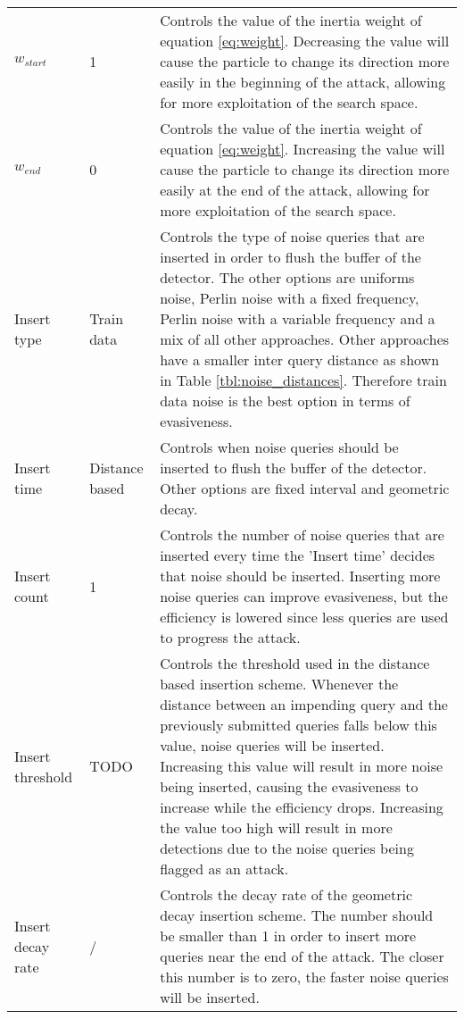 \begin{longtable}{p{3cm}p{2.5cm}p{7cm}}
$w_{start}$ &1 &Controls the value of the inertia weight of equation \ref{eq:weight}. Decreasing the value will cause the particle to change its direction more easily in the beginning of the attack, allowing for more exploitation of the search space.\\
$w_{end}$ &0 &Controls the value of the inertia weight of equation \ref{eq:weight}. Increasing the value will cause the particle to change its direction more easily at the end of the attack, allowing for more exploitation of the search space.\\
Insert type &Train data &Controls the type of noise queries that are inserted in order to flush the buffer of the detector. The other options are uniforms noise, Perlin noise with a fixed frequency, Perlin noise with a variable frequency and a mix of all other approaches. Other approaches have a smaller inter query distance as shown in Table \ref{tbl:noise_distances}. Therefore train data noise is the best option in terms of evasiveness.\\
Insert time &Distance based &Controls when noise queries should be inserted to flush the buffer of the detector. Other options are fixed interval and geometric decay.\\
Insert count &1 &Controls the number of noise queries that are inserted every time the 'Insert time' decides that noise should be inserted. Inserting more noise queries can improve evasiveness, but the efficiency is lowered since less queries are used to progress the attack.\\
Insert threshold &TODO &Controls the threshold used in the distance based insertion scheme. Whenever the distance between an impending query and the previously submitted queries falls below this value, noise queries will be inserted. Increasing this value will result in more noise being inserted, causing the evasiveness to increase while the efficiency drops. Increasing the value too high will result in more detections due to the noise queries being flagged as an attack.\\
Insert decay rate &/ &Controls the decay rate of the geometric decay insertion scheme. The number should be smaller than 1 in order to insert more queries near the end of the attack. The closer this number is to zero, the faster noise queries will be inserted.\\
\end{longtable}

